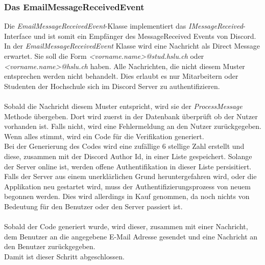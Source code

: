 \documentclass[a4paper, table]{article}
\begin{document}
\subsubsection*{Das EmailMessageReceivedEvent}
Die \textit{EmailMessageReceivedEvent}-Klasse implementiert das \textit{IMessageReceived}-Interface 
und ist somit ein Empfänger des MessageReceived Events von Discord.
In der \textit{EmailMessageReceivedEvent} Klasse wird eine Nachricht als Direct Message erwartet. 
Sie soll die Form \textit{<vorname.name>@stud.hslu.ch} oder \textit{<vorname.name>@hslu.ch} haben. 
Alle Nachrichten, die nicht diesem Muster entsprechen werden nicht behandelt. 
Dies erlaubt es nur Mitarbeitern oder Studenten der Hochschule sich im Discord Server zu authentifizieren.\\\\
Sobald die Nachricht diesem Muster entspricht, wird sie der \textit{ProcessMessage} Methode übergeben. 
Dort wird zuerst in der Datenbank überprüft ob der Nutzer vorhanden ist. 
Falls nicht, wird eine Fehlermeldung an den Nutzer zurückgegeben. 
Wenn alles stimmt, wird ein Code für die Verifikation generiert.\\ 
Bei der Generierung des Codes wird eine zufällige 6 stellige Zahl erstellt und diese, zusammen mit der Discord Author Id, in einer Liste gespeichert. 
Solange der Server online ist, werden offene Authentifikation in dieser Liste persisitiert. 
Falls der Server aus einem unerklärlichen Grund heruntergefahren wird, oder die Applikation neu gestartet wird, 
muss der Authentifizierungsprozess von neuem begonnen werden.
Dies wird allerdings in Kauf genommen, da noch nichts von Bedeutung für den Benutzer oder den Server passiert ist.\\\\
Sobald der Code generiert wurde, wird dieser, zusammen mit einer Nachricht, dem Benutzer an die angegebene E-Mail Adresse gesendet 
und eine Nachricht an den Benutzer zurückgegeben.\\
Damit ist dieser Schritt abgeschlossen.
\end{document}
